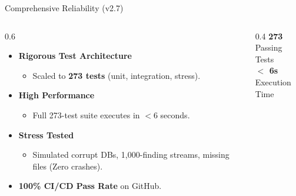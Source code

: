 \documentclass[aspectratio=169, 10pt]{beamer}
\begin{document}
\begin{frame}{Comprehensive Reliability (v2.7)}
  \begin{columns}[T]
    \begin{column}{0.6\textwidth}
      \begin{itemize}\setlength\itemsep{1em}
        \item \textbf{Rigorous Test Architecture}
          \begin{itemize}
            \item Scaled to \textbf{273 tests} (unit, integration, stress).
          \end{itemize}
        \item \textbf{High Performance}
          \begin{itemize}
            \item Full 273-test suite executes in $< 6$ seconds.
          \end{itemize}
        \item \textbf{Stress Tested}
          \begin{itemize}
            \item Simulated corrupt DBs, 1,000-finding streams, missing files (Zero crashes).
          \end{itemize}
        \item \textbf{100\% CI/CD Pass Rate} on GitHub.
      \end{itemize}
    \end{column}
    \begin{column}{0.4\textwidth}
      \centering
      \vspace{0.5em}
      {\fontsize{40}{45}\selectfont\bfseries\color{acrAccent} 273}\\
      {\large\color{acrSlate} Passing Tests}\\[1em]

      {\fontsize{28}{32}\selectfont\bfseries\color{acrGold} $<$ 6s}\\
      {\large\color{acrSlate} Execution Time}\\[1em]
    \end{column}
  \end{columns}
\end{frame}
\end{document}
